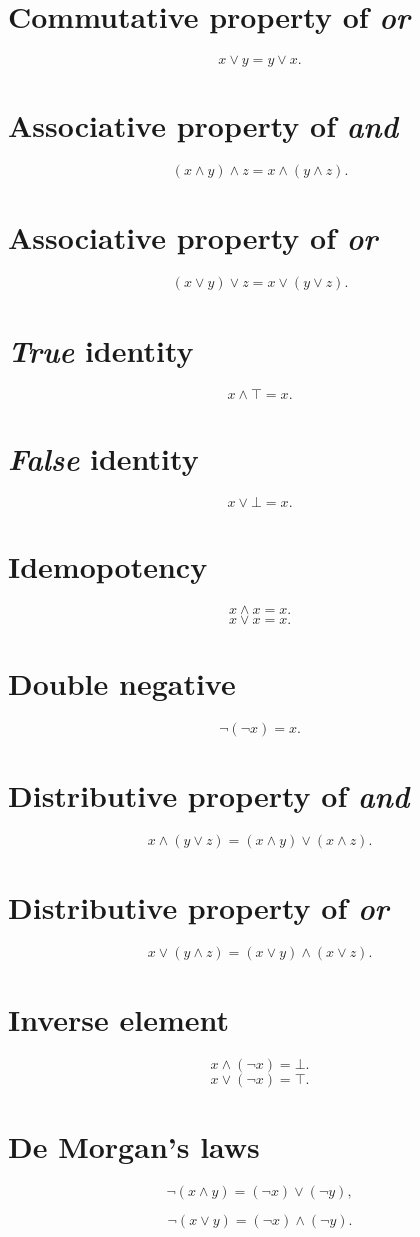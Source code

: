 \documentclass[12pt]{article}
\begin{document}
\section*{Commutative property of \textit{or}}
\[x\lor y=y\lor x.\]
\section*{Associative property of \textit{and}}
\[(x\land y)\land z=x\land(y\land z).\]
\section*{Associative property of \textit{or}}
\[(x\lor y)\lor z=x\lor(y\lor z).\]
\section*{\textit{True} identity}
\[x\land\top=x.\]
\section*{\textit{False} identity}
\[x\lor\bot=x.\]
\section*{Idemopotency}
\[x\land x=x.\]
\[x\lor x=x.\]
\section*{Double negative}
\[\lnot(\lnot x)=x.\]
\section*{Distributive property of \textit{and}}
\[x\land(y\lor z)=(x\land y)\lor(x\land z).\]
\section*{Distributive property of \textit{or}}
\[x\lor(y\land z)=(x\lor y)\land(x\lor z).\]
\section*{Inverse element}
\[x\land(\lnot x)=\bot.\]
\[x\lor(\lnot x)=\top.\]
\section*{De Morgan's laws}
\[\lnot(x\land y)=(\lnot x)\lor(\lnot y),\]

\[\lnot(x\lor y)=(\lnot x)\land(\lnot y).\]
\end{document}
